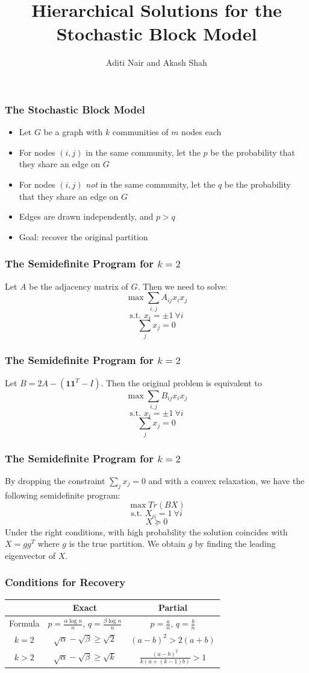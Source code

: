\documentclass[10pt]{beamer}
\title{Hierarchical Solutions for the Stochastic Block Model}
\author{Aditi Nair and Akash Shah}
\begin{document}
\maketitle

\begin{frame}
\frametitle{The Stochastic Block Model}
\begin{itemize}
\item{Let $G$ be a graph with $k$ communities of $m$ nodes each}
\item{For nodes $(i,j)$ in the same community, let the $p$ be the probability that they share an edge on $G$}
\item{For nodes $(i,j)$ \textit{not} in the same community, let the $q$ be the probability that they share an edge on $G$}
\item{Edges are drawn independently, and $p>q$}
\item{Goal: recover the original partition}
\end{itemize}
\end{frame}

\begin{frame}
\frametitle{The Semidefinite Program for $k=2$}
Let $A$ be the adjacency matrix of $G$. Then we need to solve:
$$\max \sum_{i,j} A_{ij} x_{i} x_{j} $$
$$ \text{s.t. } x_i = \pm 1 \ \forall i$$
$$\sum_j x_j = 0$$
\end{frame}

\begin{frame}
\frametitle{The Semidefinite Program for $k=2$}
Let $B = 2A - (\textbf{1}\textbf{1}^T - I)$. Then the original problem is equivalent to
$$\max \sum_{i,j} B_{ij} x_{i} x_{j} $$
$$ \text{s.t. } x_i = \pm 1 \ \forall i$$
$$\sum_j x_j = 0$$
\end{frame}

\begin{frame}
\frametitle{The Semidefinite Program for $k=2$}
By dropping the constraint $\sum_j x_j = 0$ and with a convex relaxation, we have the following semidefinite program:
$$\max Tr(BX)$$
$$ \text{s.t. } X_{ii}= 1 \ \forall i$$
$$X \succeq 0$$
Under the right conditions, with high probability the solution coincides with $X=gg^{T}$ where $g$ is the true partition. We obtain $g$ by finding the leading eigenvector of $X$.
\end{frame}

\begin{frame}
\frametitle{Conditions for Recovery}
\begin{tabular}{c | c | c }
 & Exact & Partial \\ \hline
 Formula & $p = \frac{\alpha \log n}{n}$, $q = \frac{\beta \log n}{n}$ & $p = \frac{a}{n}$, $q = \frac{b}{n}$ \\ \hline
$k = 2$ & $\sqrt{\alpha} - \sqrt{\beta} \geq \sqrt{2}$ & $(a-b)^2 > 2(a+b)$ \\ 
$k > 2$ &  $\sqrt{\alpha} - \sqrt{\beta} \geq \sqrt{k}$ & $\frac{(a-b)^2}{k(a+(k-1)b)} > 1$ \\ \hline
 \end{tabular}
\end{frame}
\end{document}
